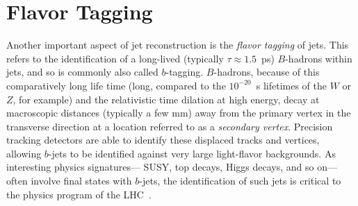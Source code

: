


\section{Flavor Tagging}

Another important aspect of jet reconstruction is the \textit{flavor tagging} of jets.  This refers to the identification of a long-lived (typically $\tau \approx 1.5$~ps) $B$-hadrons within jets, and so is commonly also called $b$-tagging. $B$-hadrons, because of this comparatively long life time (long, compared to the $10^{-20}$~s lifetimes of the $W$ or $Z$, for example) and the relativistic time dilation at high energy, decay at macroscopic distances (typically a few mm) away from the primary vertex in the transverse direction at a location referred to as a \textit{secondary vertex}. Precision tracking detectors are able to identify these displaced tracks and vertices, allowing $b$-jets to be identified against very large light-flavor backgrounds. As interesting physics signatures--- SUSY, top decays, Higgs decays, and so on--- often involve final states with $b$-jets, the identification of such jets is critical to the physics program of the LHC~\cite{ATLAS-B}.

